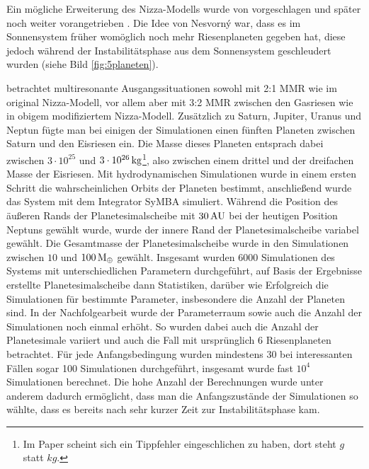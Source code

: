 \documentclass[12pt,a4paper,twoside]{article}
\renewcommand{\cite}{\citep}
\newcommand{\ME}{M_\oplus}
\begin{document}
Ein mögliche Erweiterung des Nizza-Modells wurde von \cite{Nesvorny2011} vorgeschlagen und später noch weiter vorangetrieben \cite{Nesvorny2012}. Die Idee von Nesvorný war, dass es im Sonnensystem früher womöglich noch mehr Riesenplaneten gegeben hat, diese jedoch während der Instabilitätsphase aus dem Sonnensystem geschleudert wurden (siehe Bild \ref{fig:5planeten}).

\cite{Nesvorny2011} betrachtet multiresonante Ausgangssituationen sowohl mit 2:1 MMR wie im original Nizza-Modell, vor allem aber mit 3:2 MMR zwischen den Gasriesen wie in obigem modifiziertem Nizza-Modell.
Zusätzlich zu Saturn, Jupiter, Uranus und Neptun fügte man bei einigen der Simulationen einen fünften Planeten zwischen Saturn und den Eisriesen ein. Die Masse dieses Planeten entsprach dabei zwischen $3\cdot10^{25}$ und $\unit[3\cdot10^{26}]{kg}$\footnote{Im Paper \cite{Nesvorny2011} scheint sich ein Tippfehler eingeschlichen zu haben, dort steht $\unit{g}$ statt $\unit{kg}$.}, also zwischen einem drittel und der dreifachen Masse der Eisriesen.
Mit hydrodynamischen Simulationen wurde in einem ersten Schritt die wahrscheinlichen Orbits der Planeten bestimmt, anschließend wurde das System mit dem Integrator SyMBA simuliert.
Während die Position des äußeren Rands der Planetesimalscheibe mit $\unit[30]{AU}$ bei der heutigen Position Neptuns gewählt wurde, wurde der innere Rand der Planetesimalscheibe variabel gewählt.
Die Gesamtmasse der Planetesimalscheibe wurde in den Simulationen zwischen $10$ und $\unit[100]{\ME}$ gewählt.
Insgesamt wurden 6000 Simulationen des Systems mit unterschiedlichen Parametern durchgeführt, auf Basis der Ergebnisse erstellte Planetesimalscheibe dann Statistiken, darüber wie Erfolgreich die Simulationen für bestimmte Parameter, insbesondere die Anzahl der Planeten sind.
In der Nachfolgearbeit \cite{Nesvorny2012} wurde der Parameterraum sowie auch die Anzahl der Simulationen noch einmal erhöht. So wurden dabei auch die Anzahl der Planetesimale variiert und auch die Fall mit ursprünglich 6 Riesenplaneten betrachtet. Für jede Anfangsbedingung wurden mindestens 30 bei interessanten Fällen sogar 100 Simulationen durchgeführt, insgesamt wurde fast $10^4$ Simulationen berechnet. Die hohe Anzahl der Berechnungen wurde unter anderem dadurch ermöglicht, dass man die Anfangszustände der Simulationen so wählte, dass es bereits nach sehr kurzer Zeit zur Instabilitätsphase kam.
\end{document}
